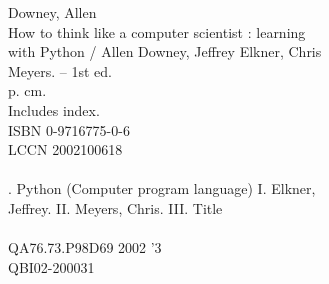 \documentclass[b5paper,10pt]{book}
\newcommand{\clearemptydoublepage}{\newpage{\pagestyle{empty}\cleardoublepage}}
\renewcommand{\clearemptydoublepage}{\cleardoublepage}
\begin{document}
{\begin{tabbing}
Downey, Allen\\
\qquad  How to think like a computer scientist : learning \\
\quad  with Python / Allen Downey, Jeffrey Elkner, Chris       \\
\quad  Meyers. -- 1st ed. \\
\qquad  p. cm.            \\
\qquad Includes index.    \\
\qquad ISBN 0-9716775-0-6 \\
\qquad LCCN 2002100618    \\
\\
. Python (Computer program language)  I. Elkner, \\
\quad  Jeffrey.  II. Meyers, Chris.  III. Title           \\
\\
\quad QA76.73.P98D69 2002 \qquad \qquad {}'3          \\
\qquad \qquad \qquad \qquad \qquad \qquad \qquad QBI02-200031    \\
\end{tabbing}

} %



\clearemptydoublepage


\clearemptydoublepage


\clearemptydoublepage

\makeatletter
\renewcommand{\l@section}{\@dottedtocline{1}{1.5em}{3.0em}}
\makeatother
\setcounter{tocdepth}{1}

\tableofcontents
\clearemptydoublepage

\mainmatter

\clearemptydoublepage

\clearemptydoublepage

\clearemptydoublepage

\clearemptydoublepage

\clearemptydoublepage

\clearemptydoublepage

\clearemptydoublepage

\clearemptydoublepage

\clearemptydoublepage

\clearemptydoublepage

\clearemptydoublepage

\clearemptydoublepage

\clearemptydoublepage

\clearemptydoublepage

\clearemptydoublepage

\clearemptydoublepage

\clearemptydoublepage

\clearemptydoublepage

\clearemptydoublepage

\clearemptydoublepage
\end{document}
